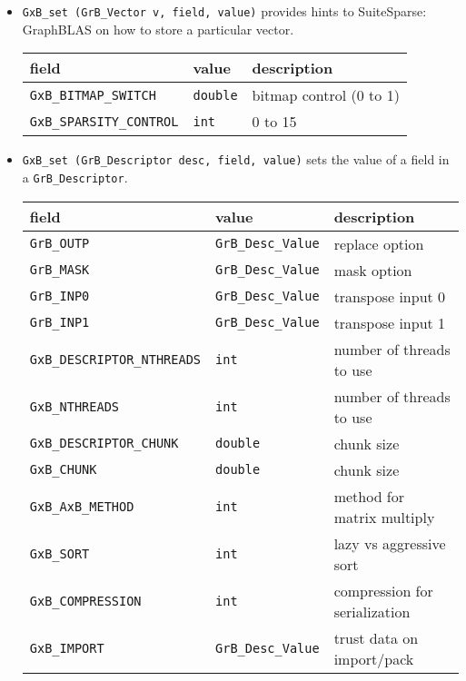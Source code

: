 \documentclass[12pt]{article}
\begin{document}
{\begin{itemize}
\item \verb'GxB_set (GrB_Vector v, field, value)' provides hints to
    SuiteSparse: GraphBLAS on how to store a particular vector.

{\footnotesize
\begin{tabular}{lll}
field                       & value         & description \\
\hline
\verb'GxB_BITMAP_SWITCH'    & \verb'double' & bitmap control (0 to 1) \\
\verb'GxB_SPARSITY_CONTROL' & \verb'int'    & 0 to 15 \\
\hline
\end{tabular}
}

\item \verb'GxB_set (GrB_Descriptor desc, field, value)' sets
    the value of a field in a \verb'GrB_Descriptor'.

{\footnotesize
\begin{tabular}{lll}
field                       & value         & description \\
\hline
\verb'GrB_OUTP'     & \verb'GrB_Desc_Value' & replace option \\
\verb'GrB_MASK'     & \verb'GrB_Desc_Value' & mask option \\
\verb'GrB_INP0'     & \verb'GrB_Desc_Value' & transpose input 0 \\
\verb'GrB_INP1'     & \verb'GrB_Desc_Value' & transpose input 1 \\
\verb'GxB_DESCRIPTOR_NTHREADS'  & \verb'int' & number of threads to use \\
\verb'GxB_NTHREADS'             & \verb'int' & number of threads to use \\
\verb'GxB_DESCRIPTOR_CHUNK'     & \verb'double' & chunk size \\
\verb'GxB_CHUNK'                & \verb'double' & chunk size \\
\verb'GxB_AxB_METHOD'           & \verb'int' & method for matrix multiply \\
\verb'GxB_SORT'                 & \verb'int' & lazy vs aggressive sort \\
\verb'GxB_COMPRESSION'          & \verb'int' & compression for serialization \\
\verb'GxB_IMPORT'    & \verb'GrB_Desc_Value' & trust data on import/pack \\
\hline
\end{tabular}
}

\end{itemize}

}
\end{document}
